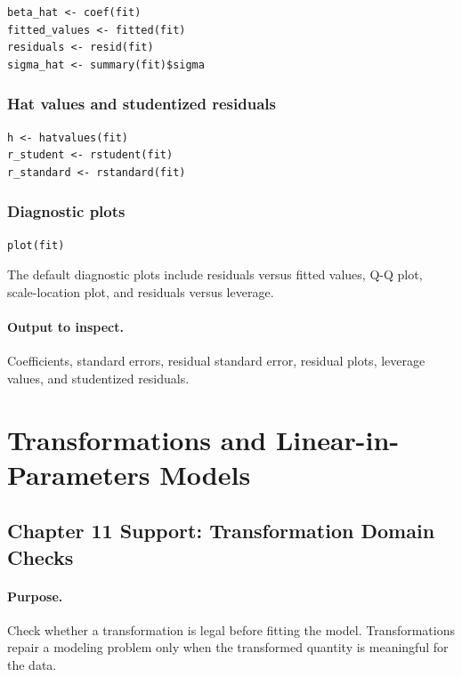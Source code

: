 \begin{verbatim}
beta_hat <- coef(fit)
fitted_values <- fitted(fit)
residuals <- resid(fit)
sigma_hat <- summary(fit)$sigma
\end{verbatim}

\subsubsection*{Hat values and studentized residuals}

\begin{verbatim}
h <- hatvalues(fit)
r_student <- rstudent(fit)
r_standard <- rstandard(fit)
\end{verbatim}

\subsubsection*{Diagnostic plots}

\begin{verbatim}
plot(fit)
\end{verbatim}

The default diagnostic plots include residuals versus fitted values, Q-Q plot, scale-location plot, and residuals versus leverage.

\paragraph{Output to inspect.} Coefficients, standard errors, residual standard error, residual plots, leverage values, and studentized residuals.

\section{Transformations and Linear-in-Parameters Models}
\label{app:cookbook-transformations-linear-in-parameters}

\subsection{Chapter 11 Support: Transformation Domain Checks}
\label{app:ch11-software-cookbook-transformation-domains}

\paragraph{Purpose.} Check whether a transformation is legal before fitting the model.  Transformations repair a modeling problem only when the transformed quantity is meaningful for the data.

